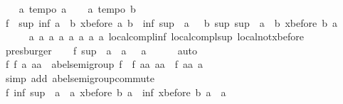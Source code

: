 \begin{isabellebody}
\ \ \isamarkupfalse%
\ a{}{\isacharcolon}\ {\isachardoublequoteopen}tempo{}\ a{\isachardoublequoteclose}\isanewline
\ \ \isamarkupfalse%
\ a{}{\isacharcolon}\ {\isachardoublequoteopen}tempo{}\ b{\isachardoublequoteclose}\isanewline
\ \ \isamarkupfalse%
\ \isamarkupfalse%
\ f{}{}{\isacharcolon}\ {\isachardoublequoteopen}{\isacharminus}\ sup\ {\isacharparenleft}inf\ a\ {\isacharparenleft}{\isacharminus}\ b{\isacharparenright}{\isacharparenright}\ {\isacharparenleft}xbefore\ a\ b{\isacharparenright}\ {\isacharequal}\ inf\ {\isacharparenleft}sup\ {\isacharparenleft}{\isacharminus}\ a{\isacharparenright}\ {\isacharparenleft}{\isacharminus}\ {\isacharparenleft}{\isacharminus}\ b{\isacharparenright}{\isacharparenright}{\isacharparenright}\ {\isacharparenleft}sup\ {\isacharparenleft}sup\ {\isacharparenleft}{\isacharminus}\ a{\isacharparenright}\ {\isacharparenleft}{\isacharminus}\ b{\isacharparenright}{\isacharparenright}\ {\isacharparenleft}xbefore\ b\ a{\isacharparenright}{\isacharparenright}{\isachardoublequoteclose}\isanewline
\ \ \ \ \isamarkupfalse%
\ a{}\ a{}\ a{}\ a{}\ a{}\ a{}\ a{}\ a{}\ local{\isachardot}compl{\isacharunderscore}inf\ local{\isachardot}compl{\isacharunderscore}sup\ local{\isachardot}not{\isacharunderscore}xbefore\ \isamarkupfalse%
\ presburger\isanewline
\ \ \isamarkupfalse%
\ f{}{}{\isacharcolon}\ {\isachardoublequoteopen}sup\ {\isacharparenleft}{\isacharminus}\ a{\isacharparenright}\ {\isacharparenleft}{\isacharminus}\ a{\isacharparenright}\ {\isacharequal}\ {\isacharminus}\ a{\isachardoublequoteclose}\isanewline
\ \ \ \ \isamarkupfalse%
\ auto\isanewline
\ \ \isamarkupfalse%
\ f{}{}{\isacharcolon}\ {\isachardoublequoteopen}{\isasymforall}f\ a\ aa{\isachardot}\ {\isasymnot}\ abel{\isacharunderscore}semigroup\ f\ {\isasymor}\ f\ {\isacharparenleft}a{\isacharcolon}{\isacharcolon}{\isacharprime}a{\isacharparenright}\ aa\ {\isacharequal}\ f\ aa\ a{\isachardoublequoteclose}\isanewline
\ \ \ \ \isamarkupfalse%
\ {\isacharparenleft}simp\ add{\isacharcolon}\ abel{\isacharunderscore}semigroup{\isachardot}commute{\isacharparenright}\isanewline
\ \ \isamarkupfalse%
\ \isamarkupfalse%
\ f{}{}{\isacharcolon}\ {\isachardoublequoteopen}inf\ {\isacharparenleft}sup\ {\isacharparenleft}{\isacharminus}\ a{\isacharparenright}\ {\isacharparenleft}{\isacharminus}\ a{\isacharparenright}{\isacharparenright}\ {\isacharparenleft}xbefore\ b\ a{\isacharparenright}\ {\isacharequal}\ inf\ {\isacharparenleft}xbefore\ b\ a{\isacharparenright}\ {\isacharparenleft}{\isacharminus}\ a{\isacharparenright}{\isachardoublequoteclose}\isanewline

\end{isabellebody}
